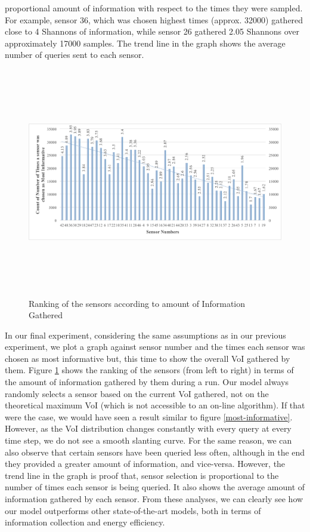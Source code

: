 proportional amount of information with respect to the times they were
sampled. For example, sensor 36, which was chosen highest times
(approx. 32000) gathered close to 4 Shannons of information, while
sensor 26 gathered 2.05 Shannons over approximately 17000 samples.
The trend line in the graph shows the average number of queries sent
to each sensor.
\begin{figure}
\begin{center}
\includegraphics[height = 100mm, width = 150mm, scale = 1]{figs/Result4}
\caption{Ranking of the sensors according to amount of Information Gathered}
\label{info-gathered}
\end{center}
\end{figure}

In our final experiment, considering the same assumptions as in our
previous experiment, we plot a graph against sensor number and the
times each sensor was chosen as most informative but, this time to show
the overall VoI gathered by them. Figure \ref{info-gathered} shows the ranking
of the sensors (from left to right) in terms of the amount of information gathered
by them during a run. Our model always randomly selects a sensor based on
the current VoI gathered, not on the theoretical maximum VoI (which is not
accessible to an on-line algorithm). If that were the case, we would
have seen a result similar to figure \ref{most-informative}. However,
as the VoI distribution changes constantly with every query at every
time step, we do not see a smooth slanting curve. For the same reason,
we can also observe that certain sensors have been queried less often,
although in the end they provided a greater amount of information, and
vice-versa. However, the trend line in the graph is proof that, sensor selection
is proportional to the number of times each sensor is being queried. It also
shows the average amount of information gathered by each sensor. From
these analyses, we can clearly see how our model outperforms other state-of-the-art models,
both in terms of information collection and energy efficiency.